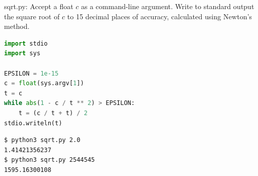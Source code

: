 \documentclass[8pt,a4paper,compress]{beamer}
\begin{document}
\begin{frame}[fragile]
\pause

\begin{framed}
\tiny sqrt.py: Accept a float $c$ as a command-line argument. Write to standard output the square root of $c$ to 15 decimal places of accuracy, calculated using Newton's method.
\end{framed}

\begin{minipage}{150pt}
\begin{lstlisting}[language=Python]
import stdio
import sys

EPSILON = 1e-15
c = float(sys.argv[1])
t = c
while abs(1 - c / t ** 2) > EPSILON:
    t = (c / t + t) / 2
stdio.writeln(t)
\end{lstlisting}
\end{minipage}%
\begin{minipage}{150pt}
\hfill {}
\end{minipage}

\pause

\begin{lstlisting}[language={}]
$ python3 sqrt.py 2.0
1.41421356237
$ python3 sqrt.py 2544545
1595.16300108
\end{lstlisting}
\end{frame}
\end{document}

